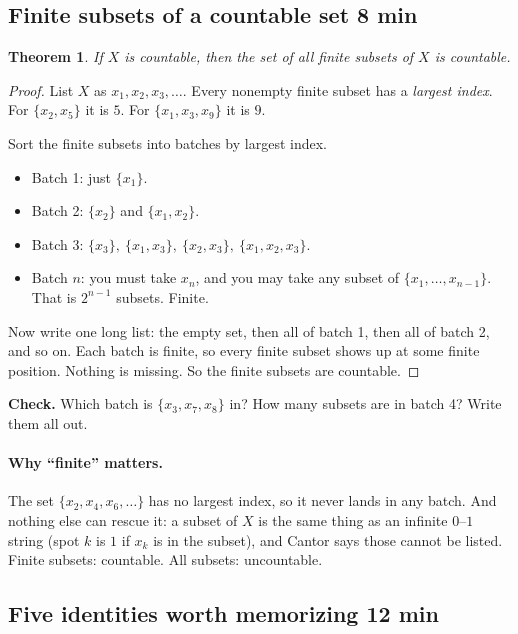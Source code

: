 \documentclass[11pt]{article}
\theoremstyle{plain}
\newtheorem{theorem}{Theorem}
\theoremstyle{definition}
\begin{document}
\subsection{Finite subsets of a countable set \hfill 8 min}

\begin{theorem}
If $X$ is countable, then the set of all \emph{finite} subsets of $X$ is countable.
\end{theorem}

\begin{proof}
List $X$ as $x_1, x_2, x_3, \dots$. Every nonempty finite subset has a \emph{largest index}. For $\{x_2, x_5\}$ it is $5$. For $\{x_1, x_3, x_9\}$ it is $9$.

Sort the finite subsets into batches by largest index.
\begin{itemize}
  \item Batch 1: just $\{x_1\}$.
  \item Batch 2: $\{x_2\}$ and $\{x_1, x_2\}$.
  \item Batch 3: $\{x_3\},\ \{x_1, x_3\},\ \{x_2, x_3\},\ \{x_1, x_2, x_3\}$.
  \item Batch $n$: you must take $x_n$, and you may take any subset of $\{x_1, \dots, x_{n-1}\}$. That is $2^{n-1}$ subsets. Finite.
\end{itemize}
Now write one long list: the empty set, then all of batch 1, then all of batch 2, and so on. Each batch is finite, so every finite subset shows up at some finite position. Nothing is missing. So the finite subsets are countable.
\end{proof}

\noindent\textbf{Check.} Which batch is $\{x_3, x_7, x_8\}$ in? How many subsets are in batch 4? Write them all out.

\paragraph{Why ``finite'' matters.} The set $\{x_2, x_4, x_6, \dots\}$ has no largest index, so it never lands in any batch. And nothing else can rescue it: a subset of $X$ is the same thing as an infinite $0$--$1$ string (spot $k$ is $1$ if $x_k$ is in the subset), and Cantor says those cannot be listed. Finite subsets: countable. All subsets: uncountable.

\subsection{Five identities worth memorizing \hfill 12 min}
\end{document}
